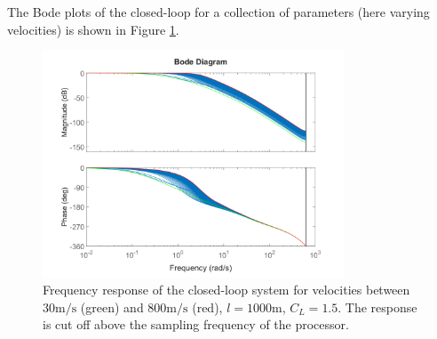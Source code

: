 The Bode plots of the closed-loop for a collection of parameters (here varying velocities) is shown in Figure \ref{fig:controller-bodes}.

\begin{figure}[ht!]
    \centering
    \includegraphics[width=0.8\textwidth]{images-design/controller_bodes.png}
    \caption[Closed-loop frequency response]{Frequency response of the closed-loop system for velocities between $30\mathrm{m/s}$ (green) and $800\mathrm{m/s}$ (red), $l=1000\mathrm{m}$, $C_L = 1.5$.
    The response is cut off above the sampling frequency of the processor.}
    \label{fig:controller-bodes}
\end{figure}



